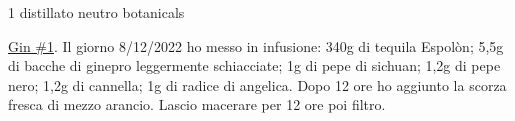 \serves{-}%
\cooktime[]{-}%
\begin{ingreds}
	1 distillato neutro
	botanicals



\end{ingreds}

\begin{method}
\underline{Gin \#1}. Il giorno 8/12/2022 ho messo in infusione: 340g di tequila Espolòn; 5,5g di bacche di ginepro leggermente schiacciate; 1g di pepe di sichuan; 1,2g di pepe nero; 1,2g di cannella; 1g di radice di angelica. Dopo 12 ore ho aggiunto la scorza fresca di mezzo arancio. Lascio macerare per 12 ore poi filtro.


\end{method}




